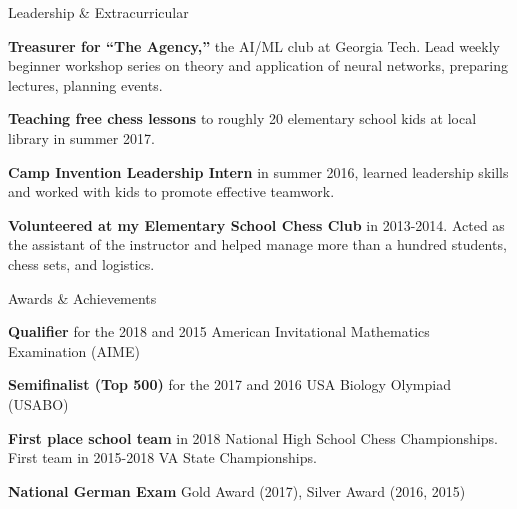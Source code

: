 \documentclass{template} %
\begin{document}
\begin{rSection}{Leadership \& Extracurricular} \itemsep -3pt \vspace{-3mm}
\item {\bf Treasurer for ``The Agency,''} the AI/ML club at Georgia Tech. Lead weekly beginner workshop series on theory and application of neural networks, preparing lectures, planning events.
\item {\bf Teaching free chess lessons} to roughly 20 elementary school kids at local library in summer 2017.
\item {\bf Camp Invention Leadership Intern} in summer 2016, learned leadership skills and worked with kids to promote effective teamwork.
\item {\bf Volunteered at my Elementary School Chess Club} in 2013-2014. Acted as the assistant of the instructor and helped manage more than a hundred students, chess sets, and logistics.
\end{rSection}


\begin{rSection}{Awards \& Achievements} \itemsep -3pt \vspace{-3mm}
\item {\bf Qualifier} for the 2018 and 2015 American Invitational Mathematics Examination (AIME)
\item {\bf Semifinalist (Top 500)} for the 2017 and 2016 USA Biology Olympiad (USABO)
\item {\bf First place school team} in 2018 National High School Chess Championships. First team in 2015-2018 VA State Championships.
\item {\bf National German Exam} Gold Award (2017),
Silver Award (2016, 2015)
\end{rSection}
\end{document}
